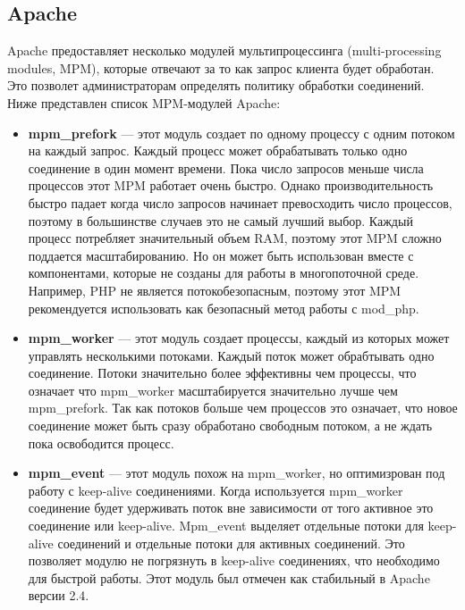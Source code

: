 \documentclass[14pt, a4paper]{article}
\begin{document}
\subsection*{Apache}

Apache предоставляет несколько модулей мультипроцессинга (multi-processing modules, MPM), 
которые отвечают за то как запрос клиента будет обработан. Это позволет администраторам определять 
политику обработки соединений. Ниже представлен список MPM-модулей Apache:

\begin{itemize}
    \item \textbf{mpm\_prefork} — этот модуль создает по одному процессу с одним потоком на каждый запрос. 
    Каждый процесс может обрабатывать только одно соединение в один момент времени. 
    Пока число запросов меньше числа процессов этот MPM работает очень быстро. 
    Однако производительность быстро падает когда число запросов начинает превосходить число процессов,
    поэтому в большинстве случаев это не самый лучший выбор. Каждый процесс потребляет значительный 
    объем RAM, поэтому этот MPM сложно поддается масштабированию. Но он может быть использован вместе 
    с компонентами, которые не созданы для работы в многопоточной среде. Например, PHP не является 
    потокобезопасным, поэтому этот MPM рекомендуется использовать как безопасный метод работы с mod\_php.
    \item \textbf{mpm\_worker} — этот модуль создает процессы, каждый из которых может управлять 
    несколькими потоками. Каждый поток может обрабтывать одно соединение. Потоки значительно 
    более эффективны чем процессы, что означает что mpm\_worker масштабируется значительно лучше чем 
    mpm\_prefork. Так как потоков больше чем процессов это означает, что новое соединение может 
    быть сразу обработано свободным потоком, а не ждать пока освободится процесс.
    \item \textbf{mpm\_event} — этот модуль похож на mpm\_worker, но оптимизрован под работу 
    с keep-alive соединениями. Когда используется mpm\_worker соединение будет удерживать 
    поток вне зависимости от того активное это соединение или keep-alive. Mpm\_event 
    выделяет отдельные потоки для keep-alive соединений и отдельные потоки для активных соединений. 
    Это позволяет модулю не погрязнуть в keep-alive соединениях, что необходимо для быстрой работы. 
    Этот модуль был отмечен как стабильный в Apache версии 2.4.
\end{itemize}
\end{document}
